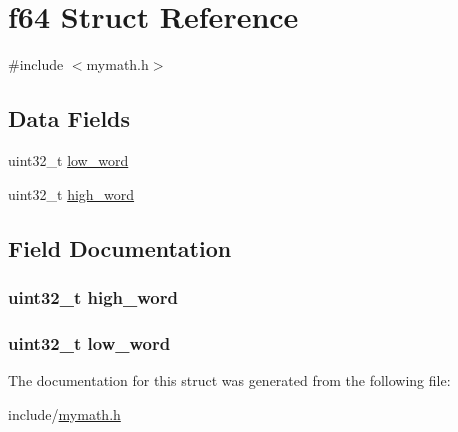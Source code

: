 \hypertarget{structf64}{\section{f64 \-Struct \-Reference}
\label{structf64}
}


{\ttfamily \#include $<$mymath.\-h$>$}

\subsection*{\-Data \-Fields}
\begin{DoxyCompactItemize}
\item 
uint32\-\_\-t \hyperlink{structf64_a0bcaca8a2513fca0a9613d1a0ac78e7b}{low\-\_\-word}
\item 
uint32\-\_\-t \hyperlink{structf64_a8566d87d9662ecfbd91fc7fa538c144c}{high\-\_\-word}
\end{DoxyCompactItemize}


\subsection{\-Field \-Documentation}
\hypertarget{structf64_a8566d87d9662ecfbd91fc7fa538c144c}{
\subsubsection[{high\-\_\-word}]{\setlength{\rightskip}{0pt plus 5cm}uint32\-\_\-t {\bf high\-\_\-word}}}\label{structf64_a8566d87d9662ecfbd91fc7fa538c144c}
\hypertarget{structf64_a0bcaca8a2513fca0a9613d1a0ac78e7b}{
\subsubsection[{low\-\_\-word}]{\setlength{\rightskip}{0pt plus 5cm}uint32\-\_\-t {\bf low\-\_\-word}}}\label{structf64_a0bcaca8a2513fca0a9613d1a0ac78e7b}


\-The documentation for this struct was generated from the following file\-:\begin{DoxyCompactItemize}
\item 
include/\hyperlink{mymath_8h}{mymath.\-h}\end{DoxyCompactItemize}
